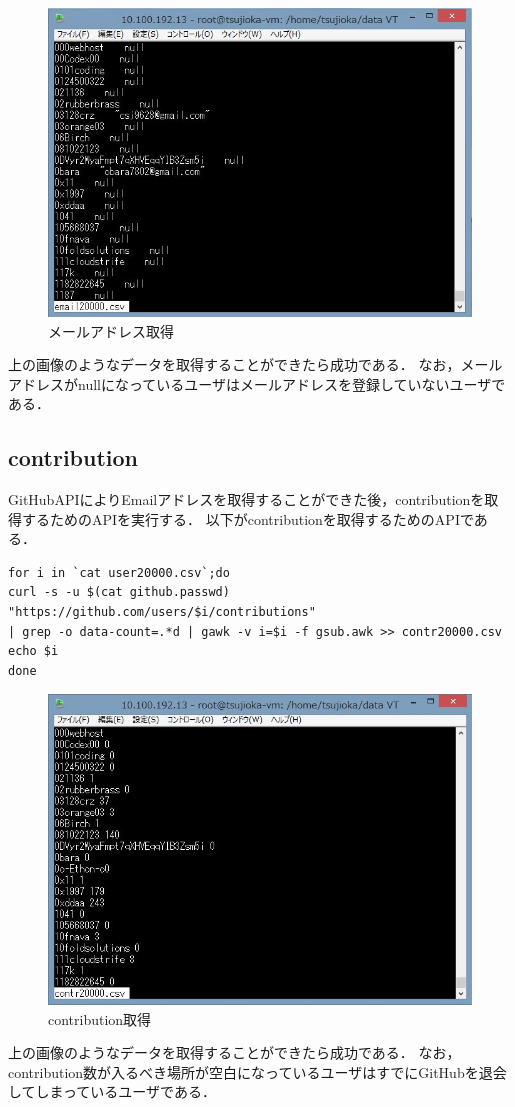 \begin{figure}[htb]
\centering
\includegraphics[width=12cm]{email20000.JPG}
\caption{メールアドレス取得}\label{サンプル図}
\end{figure}
上の画像のようなデータを取得することができたら成功である．
なお，メールアドレスがnullになっているユーザはメールアドレスを登録していないユーザである．

\newpage

\subsection{contribution}
GitHubAPIによりEmailアドレスを取得することができた後，contributionを取得するためのAPIを実行する．
以下がcontributionを取得するためのAPIである．

\begin{lstlisting}[basicstyle=\ttfamily\footnotesize, frame=single]
for i in `cat user20000.csv`;do
curl -s -u $(cat github.passwd) "https://github.com/users/$i/contributions" 
| grep -o data-count=.*d | gawk -v i=$i -f gsub.awk >> contr20000.csv
echo $i
done
\end{lstlisting}



\begin{figure}[htb]
\centering
\includegraphics[width=12cm]{contr20000.JPG}
\caption{contribution取得}\label{サンプル図}
\end{figure}
上の画像のようなデータを取得することができたら成功である．
なお，contribution数が入るべき場所が空白になっているユーザはすでにGitHubを退会してしまっているユーザである．

